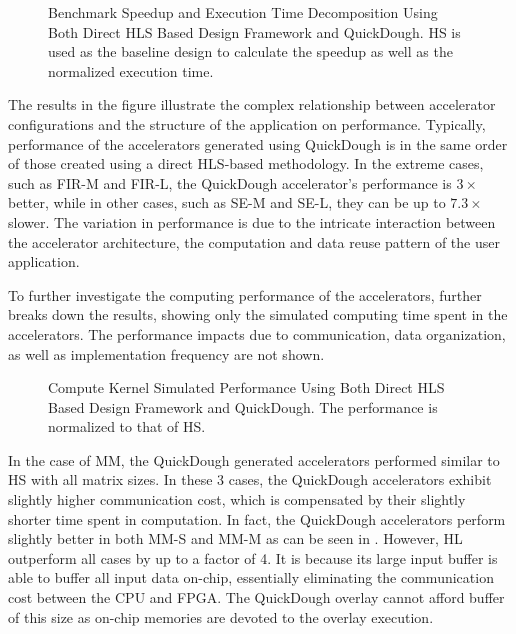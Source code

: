 \begin{figure}
\centering
{}
\qquad
{}
\qquad
{}
\qquad
{}
\caption{Benchmark Speedup and Execution Time Decomposition Using Both Direct HLS Based Design
Framework and QuickDough. HS is used as the baseline design to calculate the speedup as well as the
normalized execution time.}
\label{fig:real-perf}
\end{figure}

The results in the figure illustrate the complex relationship between accelerator configurations and
the structure of the application on performance. Typically, performance of the accelerators
generated using QuickDough is in the same order of those created using a direct HLS-based
methodology.  In the extreme cases, such as FIR-M and FIR-L, the QuickDough accelerator's
performance is $3\times$ better, while in other cases, such as SE-M and SE-L, they can be up
to $7.3\times$ slower. The variation in performance is due to the intricate interaction between the
accelerator architecture, the computation and data reuse pattern of the user application.

To further investigate the computing performance of the accelerators, 
further breaks down the results, showing only the simulated computing time spent in the
accelerators. The performance impacts due to communication, data organization, as well as
implementation frequency are not shown.

\begin{figure}
\caption{Compute Kernel Simulated Performance Using Both Direct HLS Based Design Framework and
QuickDough. The performance is normalized to that of HS.}
\label{fig:kernel-sim-perf}
\end{figure}

In the case of MM, the QuickDough generated accelerators performed similar to HS with all matrix
sizes. In these 3 cases, the QuickDough accelerators exhibit slightly higher communication cost,
which is compensated by their slightly shorter time spent in computation. In fact, the QuickDough
accelerators perform slightly better in both MM-S and MM-M as can be seen in
. However, HL outperform all cases by up to a factor of 4. It is
because its large input buffer is able to buffer all input data on-chip, essentially eliminating the
communication cost between the CPU and FPGA. The QuickDough overlay cannot afford buffer of this
size as on-chip memories are devoted to the overlay execution.

